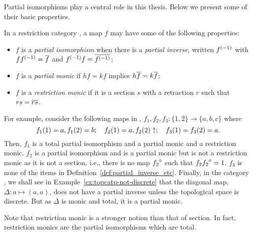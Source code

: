 Partial isomorphisms play a central role in this thesis. Below we present
some of their basic properties.

\begin{definition}\label{def:partial_inverse_etc}
  In a restriction category \X, a map $f$ may have some of the following properties:
  \begin{itemize}
    \item $f$ is a \emph{partial isomorphism} when there is a \emph{partial inverse}, written
      ${f}^{(-1)}$ with $f{f}^{(-1)} =\overline{f}$ and ${f}^{(-1)}f = \overline{{f}^{(-1)}}$;
    \item $f$ is a \emph{partial monic} if $h f = k f$ implies $h \overline{f} = k \overline{f}$;
    \item $f$ is a \emph{restriction monic} if it is a section $s$ with a retraction
      $r$ such that $r s = \overline{r s}$.
  \end{itemize}
\end{definition}

For example, consider the following maps in \Par, $f_1, f_2, f_3:\{1,2\} \to \{a,b,c\}$ where
\[
  f_1(1) = a, f_1(2)=b;\quad  f_2(1) = a, f_2(2) \uparrow;\quad    f_3(1) = f_3(2)=a.
\]
Then, $f_1$ is a total partial isomorphism and a partial monic and a restriction monic. $f_2$  is a
partial isomorphism and is a partial monic but is not a restriction monic as it is not a
section, i.e., there is no map ${f_2}^\diamond$ such that $f_2{f_2}^\diamond =
1$. $f_3$ is none of the items in Definition~\ref{def:partial_inverse_etc}. Finally, in the
category \topcatp, we shall see in Example~\ref{ex:topcatp-not-discrete} that the diagonal
map, $\Delta: a\mapsto (a,a)$, does not have a partial inverse unless the topological space is
discrete. But as $\Delta$ is monic and total, it is a partial monic.

Note that restriction monic is a stronger notion than that of section. In fact, restriction monics
are the partial isomorphisms which are total.


